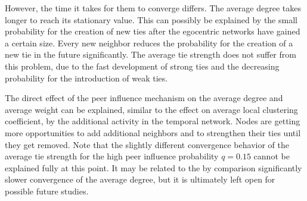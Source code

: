 However, the time it takes for them to converge differs.
The average degree takes longer to reach its stationary value.
This can possibly be explained by the small probability for the creation of new ties after the egocentric networks have gained a certain size.
Every new neighbor reduces the probability for the creation of a new tie in the future significantly.
The average tie strength does not suffer from this problem, due to the fast development of strong ties and the decreasing probability for the introduction of weak ties.

The direct effect of the peer influence mechanism on the average degree and average weight can be explained, similar to the effect on average local clustering coefficient, by the additional activity in the temporal network.
Nodes are getting more opportunities to add additional neighbors and to strengthen their ties until they get removed.
Note that the slightly different convergence behavior of the average tie strength for the high peer influence probability \( q = 0.15 \) cannot be explained fully at this point. It may be related to the by comparison significantly slower convergence of the average degree, but it is ultimately left open for possible future studies.


